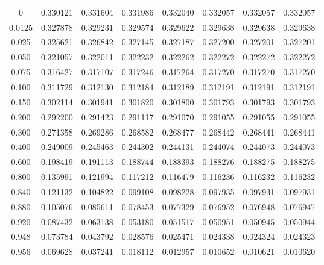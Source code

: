 \begin{threeparttable}
\begin{tabular}{S[table-format=1.4] S[table-format=1.6] S[table-format=1.6] S[table-format=1.6] S[table-format=1.6] S[table-format=1.6] S[table-format=1.6] S[table-format=1.6]}
        0   &  0.330121   &  0.331604   &  0.331986   &  0.332040   &  0.332057   &  0.332057   &  0.332057   \\
        0.0125   &  0.327878   &  0.329231   &  0.329574   &  0.329622   &  0.329638   &  0.329638   &  0.329638   \\
        0.025   &  0.325621   &  0.326842   &  0.327145   &  0.327187   &  0.327200   &  0.327201   &  0.327201   \\
        0.050   &  0.321057   &  0.322011   &  0.322232   &  0.322262   &  0.322272   &  0.322272   &  0.322272   \\
        0.075   &  0.316427   &  0.317107   &  0.317246   &  0.317264   &  0.317270   &  0.317270   &  0.317270   \\
        0.100   &  0.311729   &  0.312130   &  0.312184   &  0.312189   &  0.312191   &  0.312191   &  0.312191   \\
        0.150   &  0.302114   &  0.301941   &  0.301820   &  0.301800   &  0.301793   &  0.301793   &  0.301793   \\
        0.200   &  0.292200   &  0.291423   &  0.291117   &  0.291070   &  0.291055   &  0.291055   &  0.291055   \\
        0.300   &  0.271358   &  0.269286   &  0.268582   &  0.268477   &  0.268442   &  0.268441   &  0.268441   \\
        0.400   &  0.249009   &  0.245463   &  0.244302   &  0.244131   &  0.244074   &  0.244073   &  0.244073   \\
        0.600   &  0.198419   &  0.191113   &  0.188744   &  0.188393   &  0.188276   &  0.188275   &  0.188275   \\
        0.800   &  0.135991   &  0.121994   &  0.117212   &  0.116479   &  0.116236   &  0.116232   &  0.116232   \\
        0.840   &  0.121132   &  0.104822   &  0.099108   &  0.098228   &  0.097935   &  0.097931   &  0.097931   \\
        0.880   &  0.105076   &  0.085611   &  0.078453   &  0.077329   &  0.076952   &  0.076948   &  0.076947   \\
        0.920   &  0.087432   &  0.063138   &  0.053180   &  0.051517   &  0.050951   &  0.050945   &  0.050944   \\
        0.948   &  0.073784   &  0.043792   &  0.028576   &  0.025471   &  0.024338   &  0.024324   &  0.024323   \\
        0.956   &  0.069628   &  0.037241   &  0.018112   &  0.012957   &  0.010652   &  0.010621   &  0.010620   \\

\end{tabular}
\end{threeparttable}
